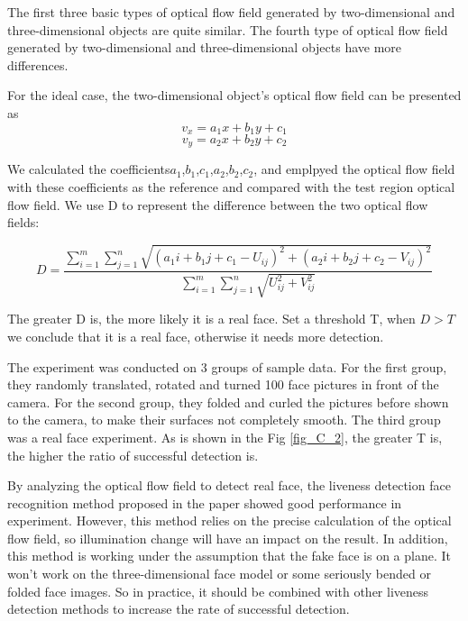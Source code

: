 \documentclass[journal]{IEEEtran}
\begin{document}
The first three basic types of optical flow field generated by two-dimensional and three-dimensional objects are quite similar. The fourth type of optical flow field generated by two-dimensional and three-dimensional objects have more differences.

For the ideal case, the two-dimensional object's optical flow field can be presented as
\begin{equation}
\label{eq_C_1}
v_x = a_1x + b_1y + c_1
\end{equation}
\begin{equation}
\label{eq_C_2}
v_y = a_2x + b_2y + c_2
\end{equation}

We calculated the coefficients$a_1$,$b_1$,$c_1$,$a_2$,$b_2$,$c_2$, and emplpyed the optical flow field with these coefficients as the reference and compared with the test region optical flow field. We use D to represent the difference between the two optical flow fields:

\begin{equation}
\label{eq_C_3}
D = \frac{\sum\limits_{i=1}^m\sum\limits_{j=1}^n\sqrt{(a_1i + b_1j + c_1 - U_{ij})^{2} + (a_2i + b_2j + c_2 - V_{ij})^{2}}}{\sum\limits_{i=1}^m \sum\limits_{j=1}^n \sqrt{U_{ij}^{2} + V_{ij}^{2}}}
\end{equation}

The greater D is, the more likely it is a real face. Set a threshold T, when $D > T$ we conclude that it is a real face, otherwise it needs more detection.

The experiment was conducted on 3 groups of sample data. For the first group, they randomly translated, rotated and turned 100 face pictures in front of the camera. For the second group,  they folded and curled the pictures before shown to the camera, to make their surfaces not completely smooth. The third group was a real face experiment. As is shown in the Fig \ref{fig_C_2}, the greater T is, the higher the ratio of successful detection is.

By analyzing the optical flow field to detect real face, the liveness detection face recognition method proposed in the paper showed good performance in experiment. However, this method relies on the precise calculation of the optical flow field, so illumination change will have an impact on the result. In addition, this method is working under the assumption that the fake face is on a plane. It won't work on the three-dimensional face model or some seriously bended or folded face images. So in practice, it should be combined with other liveness detection methods to increase the rate of successful detection.
\end{document}
